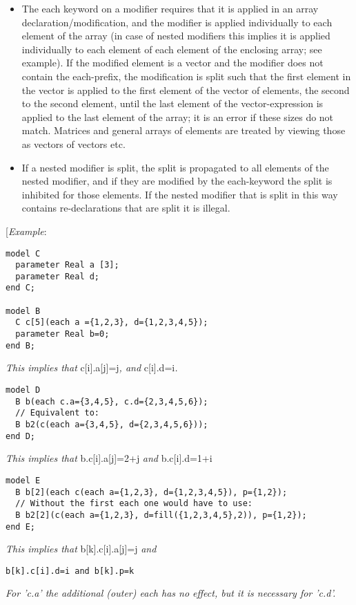 \begin{itemize}
\item
  The each keyword on a modifier requires that it is applied in an array
  declaration/modification, and the modifier is applied individually to
  each element of the array (in case of nested modifiers this implies it
  is applied individually to each element of each element of the
  enclosing array; see example). If the modified element is a vector and
  the modifier does not contain the each-prefix, the modification is
  split such that the first element in the vector is applied to the
  first element of the vector of elements, the second to the second
  element, until the last element of the vector-expression is applied to
  the last element of the array; it is an error if these sizes do not
  match. Matrices and general arrays of elements are treated by viewing
  those as vectors of vectors etc.
\item
  If a nested modifier is split, the split is propagated to all elements
  of the nested modifier, and if they are modified by the each-keyword
  the split is inhibited for those elements. If the nested modifier that
  is split in this way contains re-declarations that are split it is
  illegal.
\end{itemize}

{[}\emph{Example}:
\begin{lstlisting}[language=modelica]
model C
  parameter Real a [3];
  parameter Real d;
end C;

model B
  C c[5](each a ={1,2,3}, d={1,2,3,4,5});
  parameter Real b=0;
end B;
\end{lstlisting}

\emph{This implies that} c{[}i{]}.a{[}j{]}=j\emph{, and}
c{[}i{]}.d=i\emph{.}
\begin{lstlisting}[language=modelica]
model D
  B b(each c.a={3,4,5}, c.d={2,3,4,5,6});
  // Equivalent to:
  B b2(c(each a={3,4,5}, d={2,3,4,5,6}));
end D;
\end{lstlisting}

\emph{This implies that} b.c{[}i{]}.a{[}j{]}=2+j \emph{and}
b.c{[}i{]}.d=1+i
\begin{lstlisting}[language=modelica]
model E
  B b[2](each c(each a={1,2,3}, d={1,2,3,4,5}), p={1,2});
  // Without the first each one would have to use:
  B b2[2](c(each a={1,2,3}, d=fill({1,2,3,4,5},2)), p={1,2});
end E;
\end{lstlisting}
\emph{This implies that} b{[}k{]}.c{[}i{]}.a{[}j{]}=j \emph{and}
\begin{lstlisting}[language=modelica]
  b[k].c[i].d=i and b[k].p=k
\end{lstlisting}
\emph{For 'c.a' the additional (outer) each has no effect, but it is
necessary for 'c.d'.}

